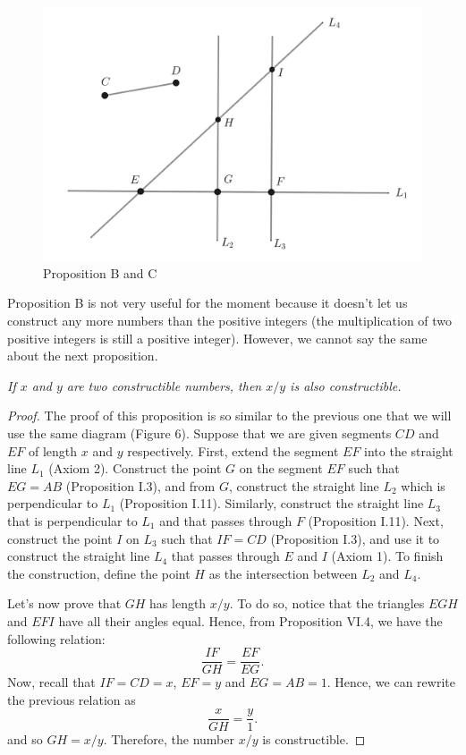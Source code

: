\documentclass{article}
\theoremstyle{plain}
\theoremstyle{definition}
\newenvironment{customthm}[1]
  {\renewcommand\theinnercustomthm{#1}\innercustomthm}
  {\endinnercustomthm}
\begin{document}
\begin{figure}[h!]
    \centering
    \includegraphics[scale=0.4]{pics/PropB.png}
    \caption{Proposition B and C}
\end{figure}

Proposition B is not very useful for the moment because it doesn't let us construct any more numbers than the positive integers (the multiplication of two positive integers is still a positive integer). However, we cannot say the same about the next proposition.

\begin{customthm}{C}\label{C}
    \textit{If $x$ and $y$ are two constructible numbers, then $x/y$ is also constructible.}
\end{customthm}

\begin{proof}
    The proof of this proposition is so similar to the previous one that we will use the same diagram (Figure 6). Suppose that we are given segments $CD$ and $EF$ of length $x$ and $y$ respectively. First, extend the segment $EF$ into the straight line $L_1$ (Axiom 2). Construct the point $G$ on the segment $EF$ such that $EG = AB$ (Proposition I.3), and from $G$, construct the straight line $L_2$ which is perpendicular to $L_1$ (Proposition I.11). Similarly, construct the straight line $L_3$ that is perpendicular to $L_1$ and that passes through $F$ (Proposition I.11). Next, construct the point $I$ on $L_3$ such that $IF = CD$ (Proposition I.3), and use it to construct the straight line $L_4$ that passes through $E$ and $I$ (Axiom 1). To finish the construction, define the point $H$ as the intersection between $L_2$ and $L_4$. 

    Let's now prove that $GH$ has length $x/y$. To do so, notice that the triangles $EGH$ and $EFI$ have all their angles equal. Hence, from Proposition VI.4, we have the following relation:
    $$\frac{IF}{GH} = \frac{EF}{EG}.$$
    Now, recall that $IF = CD = x$, $EF = y$ and $EG = AB = 1$. Hence, we can rewrite the previous relation as
    $$\frac{x}{GH} = \frac{y}{1}.$$
    and so $GH = x/y$. Therefore, the number $x/y$ is constructible.
\end{proof}
\end{document}
